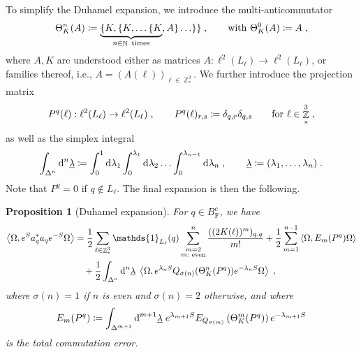 \documentclass[12pt,a4paper]{article}
\numberwithin{equation}{section}
\newcommand{\ulambda}{\underline{\lambda}}
\newcommand{\1}{\mathbb{I}}
\newcommand{\di}{\textnormal{d}}
\newcommand{\F}{\mathrm{F}}
\DeclareMathOperator{\N}{\mathbb{N}}
\DeclareMathOperator{\Z}{\mathbb{Z}}
\newcommand{\half}{\frac{1}{2}}
\newcommand{\eva}[1]{\left\langle #1 \right\rangle}
\theoremstyle{plain}
\newtheorem{proposition}[theorem]{Proposition}
\theoremstyle{definition}
\theoremstyle{remark}
\theoremstyle{plain}
\theoremstyle{definition}
\theoremstyle{remark}
\begin{document}
To simplify the Duhamel expansion, we introduce the multi-anticommutator
\begin{equation} \label{eq:Theta}
	\Theta_K^n (A)
	\coloneq \underbrace{\{ K, \{ K , \ldots \{K}_{n \in \N \textnormal{ times}} , A\} \ldots \} \} \;, \qquad
	\textnormal{with }
	\Theta_K^0 (A)
	\coloneq A \;,
\end{equation}
where $ A, K $ are understood either as matrices $ A: \ell^2(L_\ell) \to \ell^2(L_\ell) $, or families thereof, i.e., $ A = (A(\ell))_{\ell \in \Z^3_*} $. We further introduce the projection matrix
\begin{equation} \label{eq:Pq}
	P^q(\ell) : \ell^2(L_\ell) \to \ell^2(L_\ell) \;, \qquad
	P^q(\ell)_{r,s} \coloneq \delta_{q,r} \delta_{q,s} \qquad
	\textnormal{for } \ell \in \Z^3_* \;,
\end{equation}
as well as the simplex integral
\begin{equation} \label{eq:Deltan}
	\int_{\Delta^n} \di^n \ulambda
	\coloneq \int_0^1 \di \lambda_1 \int_0^{\lambda_1} \di \lambda_2 \ldots \int_0^{\lambda_{n-1}} \di \lambda_n \;, \qquad
	\ulambda \coloneq (\lambda_1, \ldots, \lambda_n) \;.
\end{equation}
Note that $ P^q = 0 $ if $ q \notin L_\ell $. The final expansion is then the following.

\begin{proposition}[Duhamel expansion]\label{prop:finexpan}
For $q \in B^c_{\F}$, we have
\begin{align} \label{eq:finexpan}
	\eva{\Omega, e^{S} a_q^* a_q e^{-S} \Omega} 
	&= \half\sum\limits_{\ell\in \Z^3_*}\mathds{1}_{L_\ell}(q) \sum\limits_{\substack{m=2\\m:\textnormal{ even}}}^n \frac{((2K(\ell))^m)_{q,q}}{m!}
		+ \half \sum\limits_{m=1}^{n-1} \eva{\Omega, E_m(P^q)\Omega}\nonumber\\
	&\quad +\half \int_{\Delta^n} \di^n\underline{\lambda} \;
		\eva{\Omega, e^{\lambda_n S}Q_{\sigma(n)}(\Theta^n_{K}(P^q)) e^{-\lambda_n S} \Omega} \;,
\end{align}
where $ \sigma(n) = 1 $ if $ n $ is even and $ \sigma(n) = 2 $ otherwise, and where
\begin{equation}\label{eq:errEm}
	E_m(P^q) \coloneq \int_{\Delta^{m+1}} \di^{m+1} \underline{\lambda} \;
		e^{\lambda_{m+1} S} E_{Q_{\sigma(m)}}\left(\Theta^{m}_{K}(P^q)\right) e^{-\lambda_{m+1} S}
\end{equation}
is the total commutation error.
\end{proposition}
\end{document}

